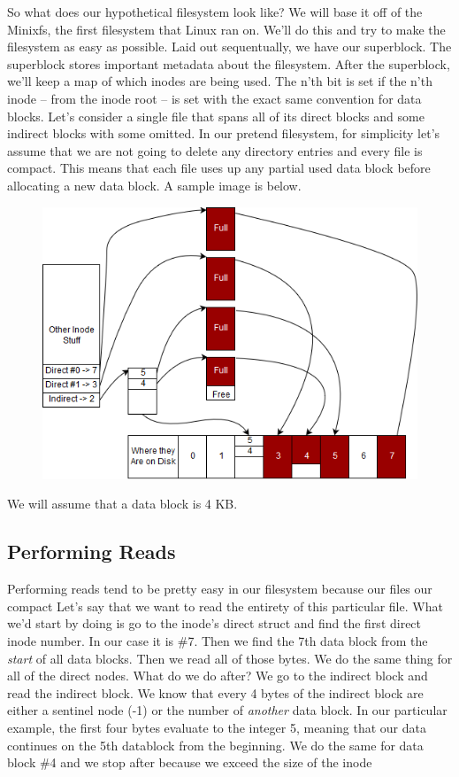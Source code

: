 So what does our hypothetical filesystem look like?
We will base it off of the Minixfs, the first filesystem that Linux ran on.
We'll do this and try to make the filesystem as easy as possible.
Laid out sequentually, we have our superblock.
The superblock stores important metadata about the filesystem.
After the superblock, we'll keep a map of which inodes are being used.
The n'th bit is set if the n'th inode -- from the inode root -- is set with the exact same convention for data blocks.
Let's consider a single file that spans all of its direct blocks and some indirect blocks with some omitted.
In our pretend filesystem, for simplicity let's assume that we are not going to delete any directory entries and every file is compact.
This means that each file uses up any partial used  data block before allocating a new data block.
A sample image is below.

\begin{figure}[htbp]
\centering
\includegraphics[width=.8\textwidth]{filesystems/images/sample_file.png}
\end{figure}

We will assume that a data block is 4 KB.

\subsection{Performing Reads}

Performing reads tend to be pretty easy in our filesystem because our files our compact
Let's say that we want to read the entirety of this particular file.
What we'd start by doing is go to the inode's direct struct and find the first direct inode number. In our case it is \#7.
Then we find the 7th data block from the \textit{start} of all data blocks.
Then we read all of those bytes.
We do the same thing for all of the direct nodes.
What do we do after? We go to the indirect block and read the indirect block.
We know that every 4 bytes of the indirect block are either a sentinel node (-1) or the number of \textit{another} data block.
In our particular example, the first four bytes evaluate to the integer 5, meaning that our data continues on the 5th datablock from the beginning.
We do the same for data block \#4 and we stop after because we exceed the size of the inode

